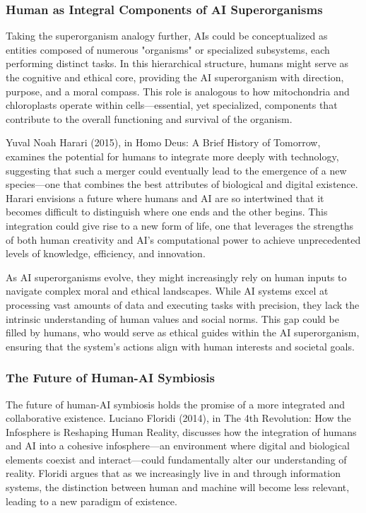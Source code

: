 \documentclass[12pt,twoside]{article}
\begin{document}
\subsubsection{Human as Integral Components of AI Superorganisms}

Taking the superorganism analogy further, AIs could be conceptualized as entities composed of numerous "organisms" or specialized subsystems, each performing distinct tasks. In this hierarchical structure, humans might serve as the cognitive and ethical core, providing the AI superorganism with direction, purpose, and a moral compass. This role is analogous to how mitochondria and chloroplasts operate within cells—essential, yet specialized, components that contribute to the overall functioning and survival of the organism.

Yuval Noah Harari (2015), in Homo Deus: A Brief History of Tomorrow, examines the potential for humans to integrate more deeply with technology, suggesting that such a merger could eventually lead to the emergence of a new species—one that combines the best attributes of biological and digital existence. Harari envisions a future where humans and AI are so intertwined that it becomes difficult to distinguish where one ends and the other begins. This integration could give rise to a new form of life, one that leverages the strengths of both human creativity and AI's computational power to achieve unprecedented levels of knowledge, efficiency, and innovation.

As AI superorganisms evolve, they might increasingly rely on human inputs to navigate complex moral and ethical landscapes. While AI systems excel at processing vast amounts of data and executing tasks with precision, they lack the intrinsic understanding of human values and social norms. This gap could be filled by humans, who would serve as ethical guides within the AI superorganism, ensuring that the system's actions align with human interests and societal goals.

\subsubsection{The Future of Human-AI Symbiosis}

The future of human-AI symbiosis holds the promise of a more integrated and collaborative existence. Luciano Floridi (2014), in The 4th Revolution: How the Infosphere is Reshaping Human Reality, discusses how the integration of humans and AI into a cohesive infosphere—an environment where digital and biological elements coexist and interact—could fundamentally alter our understanding of reality. Floridi argues that as we increasingly live in and through information systems, the distinction between human and machine will become less relevant, leading to a new paradigm of existence.
\end{document}
